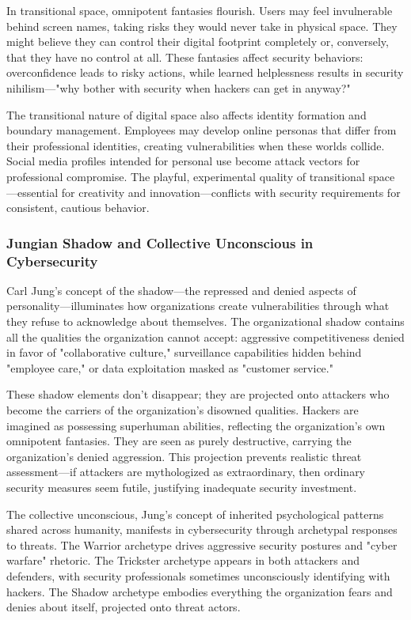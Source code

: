 \documentclass[11pt,a4paper]{article}
\begin{document}
In transitional space, omnipotent fantasies flourish. Users may feel invulnerable behind screen names, taking risks they would never take in physical space. They might believe they can control their digital footprint completely or, conversely, that they have no control at all. These fantasies affect security behaviors: overconfidence leads to risky actions, while learned helplessness results in security nihilism—"why bother with security when hackers can get in anyway?"

The transitional nature of digital space also affects identity formation and boundary management. Employees may develop online personas that differ from their professional identities, creating vulnerabilities when these worlds collide. Social media profiles intended for personal use become attack vectors for professional compromise. The playful, experimental quality of transitional space—essential for creativity and innovation—conflicts with security requirements for consistent, cautious behavior.

\subsubsection{Jungian Shadow and Collective Unconscious in Cybersecurity}

Carl Jung's concept of the shadow\cite{jung1969}—the repressed and denied aspects of personality—illuminates how organizations create vulnerabilities through what they refuse to acknowledge about themselves. The organizational shadow contains all the qualities the organization cannot accept: aggressive competitiveness denied in favor of "collaborative culture," surveillance capabilities hidden behind "employee care," or data exploitation masked as "customer service."

These shadow elements don't disappear; they are projected onto attackers who become the carriers of the organization's disowned qualities. Hackers are imagined as possessing superhuman abilities, reflecting the organization's own omnipotent fantasies. They are seen as purely destructive, carrying the organization's denied aggression. This projection prevents realistic threat assessment—if attackers are mythologized as extraordinary, then ordinary security measures seem futile, justifying inadequate security investment.

The collective unconscious, Jung's concept of inherited psychological patterns shared across humanity, manifests in cybersecurity through archetypal responses to threats. The Warrior archetype drives aggressive security postures and "cyber warfare" rhetoric. The Trickster archetype appears in both attackers and defenders, with security professionals sometimes unconsciously identifying with hackers. The Shadow archetype embodies everything the organization fears and denies about itself, projected onto threat actors.
\end{document}
